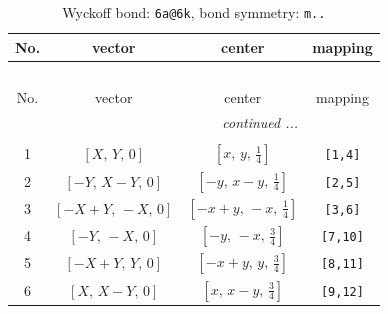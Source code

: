 \documentclass[fleqn,8pt]{jsarticle}
\begin{document}
\renewcommand{\arraystretch}{1.2}
\begin{longtable}{cccc}
\caption{Wyckoff bond: {\tt 6a@6k}, bond symmetry: {\tt m..}}
 \\
 \hline \hline
No. & vector & center & mapping \\ \hline \endfirsthead

\multicolumn{3}{l}{\tablename\ \thetable{}} \\
 \hline \hline
No. & vector & center & mapping \\ \hline \endhead

 \hline \hline
\multicolumn{3}{r}{\footnotesize\it continued ...} \\ \endfoot

 \hline \hline
\multicolumn{3}{r}{} \\ \endlastfoot

1 & $\left[ X,\, Y,\, 0 \right]$ & $\left[ x,\, y,\, \frac{1}{4} \right]$ & {\tt [1,4]} \\ \hline
2 & $\left[ - Y,\, X - Y,\, 0 \right]$ & $\left[ - y,\, x - y,\, \frac{1}{4} \right]$ & {\tt [2,5]} \\ \hline
3 & $\left[ - X + Y,\, - X,\, 0 \right]$ & $\left[ - x + y,\, - x,\, \frac{1}{4} \right]$ & {\tt [3,6]} \\ \hline
4 & $\left[ - Y,\, - X,\, 0 \right]$ & $\left[ - y,\, - x,\, \frac{3}{4} \right]$ & {\tt [7,10]} \\ \hline
5 & $\left[ - X + Y,\, Y,\, 0 \right]$ & $\left[ - x + y,\, y,\, \frac{3}{4} \right]$ & {\tt [8,11]} \\ \hline
6 & $\left[ X,\, X - Y,\, 0 \right]$ & $\left[ x,\, x - y,\, \frac{3}{4} \right]$ & {\tt [9,12]} \\
\end{longtable}
\renewcommand{\arraystretch}{1.2}
\end{document}
